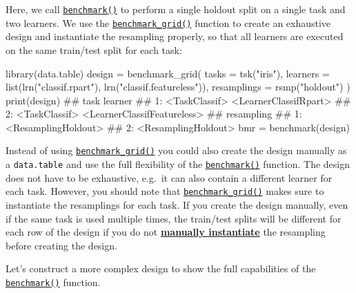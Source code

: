 \documentclass[]{article}
\newenvironment{Shaded}{}{}
\newcommand{\DataTypeTok}[1]{#1}
\newcommand{\KeywordTok}[1]{\textcolor[rgb]{0.00,0.00,1.00}{#1}}
\newcommand{\NormalTok}[1]{#1}
\newcommand{\StringTok}[1]{\textcolor[rgb]{0.00,0.50,0.50}{#1}}
\renewenvironment{Shaded} {\begin{snugshade}\small} {\end{snugshade}}
\begin{document}
Here, we call \href{https://mlr3.mlr-org.com/reference/benchmark.html}{\texttt{benchmark()}} to perform a single holdout split on a single task and two learners.
We use the \href{https://mlr3.mlr-org.com/reference/benchmark_grid.html}{\texttt{benchmark\_grid()}} function to create an exhaustive design and instantiate the resampling properly, so that all learners are executed on the same train/test split for each task:

\begin{Shaded}
\begin{Highlighting}[]
\KeywordTok{library}\NormalTok{(data.table)}
\NormalTok{design =}\StringTok{ }\KeywordTok{benchmark_grid}\NormalTok{(}
  \DataTypeTok{tasks =} \KeywordTok{tsk}\NormalTok{(}\StringTok{"iris"}\NormalTok{),}
  \DataTypeTok{learners =} \KeywordTok{list}\NormalTok{(}\KeywordTok{lrn}\NormalTok{(}\StringTok{"classif.rpart"}\NormalTok{), }\KeywordTok{lrn}\NormalTok{(}\StringTok{"classif.featureless"}\NormalTok{)),}
  \DataTypeTok{resamplings =} \KeywordTok{rsmp}\NormalTok{(}\StringTok{"holdout"}\NormalTok{)}
\NormalTok{)}
\KeywordTok{print}\NormalTok{(design)}
\NormalTok{##             task                     learner}
\NormalTok{## 1: <TaskClassif>       <LearnerClassifRpart>}
\NormalTok{## 2: <TaskClassif> <LearnerClassifFeatureless>}
\NormalTok{##             resampling}
\NormalTok{## 1: <ResamplingHoldout>}
\NormalTok{## 2: <ResamplingHoldout>}
\NormalTok{bmr =}\StringTok{ }\KeywordTok{benchmark}\NormalTok{(design)}
\end{Highlighting}
\end{Shaded}

Instead of using \href{https://mlr3.mlr-org.com/reference/benchmark_grid.html}{\texttt{benchmark\_grid()}} you could also create the design manually as a \texttt{data.table} and use the full flexibility of the \href{https://mlr3.mlr-org.com/reference/benchmark.html}{\texttt{benchmark()}} function.
The design does not have to be exhaustive, e.g.~it can also contain a different learner for each task.
However, you should note that \href{https://mlr3.mlr-org.com/reference/benchmark_grid.html}{\texttt{benchmark\_grid()}} makes sure to instantiate the resamplings for each task.
If you create the design manually, even if the same task is used multiple times, the train/test splits will be different for each row of the design if you do not \protect\hyperlink{resampling-inst}{\textbf{manually instantiate}} the resampling before creating the design.

Let's construct a more complex design to show the full capabilities of the \href{https://mlr3.mlr-org.com/reference/benchmark.html}{\texttt{benchmark()}} function.
\end{document}
